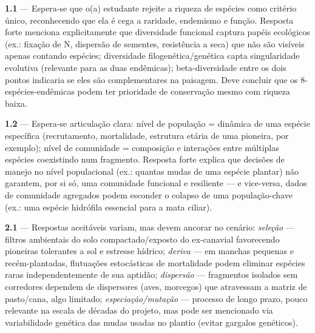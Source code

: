 \documentclass[
  brazilian,
  letterpaper,
  DIV=11,
  numbers=noendperiod]{scrartcl}
\begin{document}
\begin{tcolorbox}[enhanced jigsaw, arc=.35mm, bottomrule=.15mm, bottomtitle=1mm, breakable, colback=white, colbacktitle=quarto-callout-important-color!10!white, colframe=quarto-callout-important-color-frame, coltitle=black, left=2mm, leftrule=.75mm, opacityback=0, opacitybacktitle=0.6, rightrule=.15mm, title=\textcolor{quarto-callout-important-color}{\faExclamation}\hspace{0.5em}{Guia de correção --- o que se espera nas respostas (uso do
professor/monitor)}, titlerule=0mm, toprule=.15mm, toptitle=1mm]

\textbf{1.1} --- Espera-se que o(a) estudante rejeite a riqueza de
espécies como critério único, reconhecendo que ela é cega a raridade,
endemismo e função. Resposta forte menciona explicitamente que
diversidade funcional captura papéis ecológicos (ex.: fixação de N,
dispersão de sementes, resistência a seca) que não são visíveis apenas
contando espécies; diversidade filogenética/genética capta singularidade
evolutiva (relevante para as duas endêmicas); beta-diversidade entre os
dois pontos indicaria se eles são complementares na paisagem. Deve
concluir que os 8-espécies-endêmicas podem ter prioridade de conservação
mesmo com riqueza baixa.

\textbf{1.2} --- Espera-se articulação clara: nível de população =
dinâmica de uma espécie específica (recrutamento, mortalidade, estrutura
etária de uma pioneira, por exemplo); nível de comunidade = composição e
interações entre múltiplas espécies coexistindo num fragmento. Resposta
forte explica que decisões de manejo no nível populacional (ex.: quantas
mudas de uma espécie plantar) não garantem, por si só, uma comunidade
funcional e resiliente --- e vice-versa, dados de comunidade agregados
podem esconder o colapso de uma população-chave (ex.: uma espécie
hidrófila essencial para a mata ciliar).

\textbf{2.1} --- Respostas aceitáveis variam, mas devem ancorar no
cenário: \emph{seleção} --- filtros ambientais do solo
compactado/exposto do ex-canavial favorecendo pioneiras tolerantes a sol
e estresse hídrico; \emph{deriva} --- em manchas pequenas e
recém-plantadas, flutuações estocásticas de mortalidade podem eliminar
espécies raras independentemente de sua aptidão; \emph{dispersão} ---
fragmentos isolados sem corredores dependem de dispersores (aves,
morcegos) que atravessam a matriz de pasto/cana, algo limitado;
\emph{especiação/mutação} --- processo de longo prazo, pouco relevante
na escala de décadas do projeto, mas pode ser mencionado via
variabilidade genética das mudas usadas no plantio (evitar gargalos
genéticos).


\end{tcolorbox}
\end{document}
